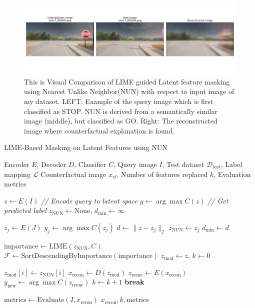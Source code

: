 \begin{figure}
    \centering
    \includegraphics[width=1\linewidth]{img//masking//lime_on_latent_nun/town7_000695.png_side_by_side.png}
    \caption{
    This is Visual Comparison of LIME guided Latent feature masking using Nearest Unlike Neighbor(NUN) with respect to input image of my dataset. LEFT: Example of the query image which is first classified as STOP. NUN is derived from a semantically similar image (middle), but classified as GO. Right: The reconstructed image where counterfactual explanation is found.
    }
    \label{fig:nun_cf_side_by_side}
\end{figure}


\begin{algorithm}[htbp]
\caption{LIME-Based Masking on Latent Features using NUN}
\label{alg:nun_lime}
\begin{algorithmic}[1]
\REQUIRE Encoder $E$, Decoder $D$, Classifier $C$, Query image $I$, Test dataset $\mathcal{D}_{\text{test}}$, Label mapping $\mathcal{L}$
\ENSURE Counterfactual image $x_{\text{cf}}$, Number of features replaced $k$, Evaluation metrics

\STATE $z \leftarrow E(I)$ \hfill \textit{// Encode query to latent space}
\STATE $y \leftarrow \arg\max C(z)$ \hfill \textit{// Get predicted label}
\STATE $z_{\text{NUN}} \leftarrow \text{None}$, $d_{\min} \leftarrow \infty$

    \STATE $z_j \leftarrow E(J)$
    \STATE $y_j \leftarrow \arg\max C(z_j)$
        \STATE $d \leftarrow \|z - z_j\|_2$
            \STATE $z_{\text{NUN}} \leftarrow z_j$
            \STATE $d_{\min} \leftarrow d$
        \ENDIF
    \ENDIF
\ENDFOR

\STATE $\text{importance} \leftarrow \text{LIME}(z_{\text{NUN}}, C)$
\STATE $\mathcal{F} \leftarrow \text{SortDescendingByImportance}(\text{importance})$
\STATE $z_{\text{mod}} \leftarrow z$, $k \leftarrow 0$

    \STATE $z_{\text{mod}}[i] \leftarrow z_{\text{NUN}}[i]$
    \STATE $x_{\text{recon}} \leftarrow D(z_{\text{mod}})$
    \STATE $z_{\text{reenc}} \leftarrow E(x_{\text{recon}})$
    \STATE $y_{\text{new}} \leftarrow \arg\max C(z_{\text{reenc}})$
    \STATE $k \leftarrow k + 1$
        \STATE \textbf{break}
    \ENDIF
\ENDFOR

\STATE $\text{metrics} \leftarrow \text{Evaluate}(I, x_{\text{recon}})$
\RETURN $x_{\text{recon}}, k, \text{metrics}$
\end{algorithmic}
\end{algorithm}



